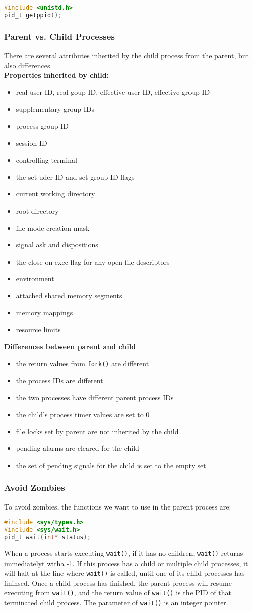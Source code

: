 \documentclass{article}
\newcommand{\bold}[1]{\textbf{#1}}
\renewcommand{\b}{\item[$\circ$]}
\newcommand{\newlist}{\begin{itemize}}
\renewcommand{\endlist}{\end{itemize}}
\newcommand{\code}[1]{\texttt{#1}}
\begin{document}
\begin{lstlisting}[language=c]
#include <unistd.h>
pid_t getppid();
\end{lstlisting}

\subsubsection{Parent vs. Child Processes}

There are several attributes inherited by the child process from the parent, but also differences. \\

\bold{Properties inherited by child:}

\newlist
\b real user ID, real goup ID, effective user ID, effective group ID
\b supplementary group IDs
\b process group ID
\b session ID
\b controlling terminal
\b the set-uder-ID and set-group-ID flags
\b current working directory
\b root directory
\b file mode creation mask
\b signal ask and dispositions
\b the close-on-exec flag for any open file descriptors
\b environment
\b attached shared memory segments
\b memory mappings
\b resource limits
\endlist

\bold{Differences between parent and child}

\newlist
\b the return values from \code{fork()} are different
\b the process IDs are different
\b the two processes have different parent process IDs
\b the child's process timer values are set to 0
\b file locks set by parent are not inherited by the child
\b pending alarms are cleared for the child
\b the set of pending signals for the child is set to the empty set
\endlist

\subsubsection{Avoid Zombies}

To avoid zombies, the functions we want to use in the parent process are:

\begin{lstlisting}[language=c]
#include <sys/types.h>
#include <sys/wait.h>
pid_t wait(int* status);
\end{lstlisting}

When a process starts executing \code{wait()}, if it has no children, \code{wait()} returns immediatelyt witha  -1. If this process has a child or multiple child processes, it will halt at the line where \code{wait()} is called, until one of its child processes has finihsed. Once a child process has finished, the parent process will resume executing from \code{wait()}, and the return value of \code{wait()} is the PID of that terminated child process. The parameter of \code{wait()} is an integer pointer. 
\end{document}
